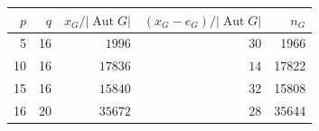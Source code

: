 \begin{center}\begin{tabular}{rrrrr}\toprule
$p$&$q$&$x_G/|\operatorname{Aut}G|$&$(x_G-e_G)/|\operatorname{Aut}G|$&$n_G$\\\midrule
5 & 16 & $1996$ & $30$ & 1966\\
10 & 16 & $17836$ & $14$ & 17822\\
15 & 16 & $15840$ & $32$ & 15808\\
16 & 20 & $35672$ & $28$ & 35644\\
\bottomrule\end{tabular}\end{center}
